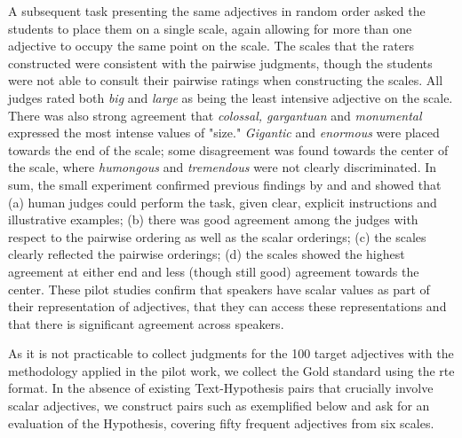 \documentclass[10pt]{article}
\begin{document}
A subsequent task presenting the same adjectives in random order asked the students to place them 
on a single scale, again allowing for more than one adjective to occupy the same point on the scale. 
The scales that the raters constructed were consistent with the pairwise judgments, though the students were not able 
to consult their pairwise ratings when constructing the scales. 
All judges rated both \textit{big} and \textit{large} as being the least intensive adjective on the scale. There was also 
strong agreement that \textit{colossal, gargantuan} and \textit{monumental} expressed the most intense values of "size."
\textit{Gigantic} and \textit{enormous} were placed towards the end of the scale; 
some disagreement was found towards the center of the scale, where \textit{humongous} and \textit{tremendous} 
were not clearly discriminated. In sum, the small experiment confirmed previous findings by \cite{sheinman2009adjscales} and \cite{mathieu2010verbs} 
and showed that (a) human judges could perform the task, 
given clear, explicit instructions and illustrative examples; (b) there was good agreement among the judges with respect 
to the pairwise ordering as well as the scalar orderings; (c) the scales clearly reflected the pairwise orderings; (d) the 
scales showed the highest agreement at either end and less (though still good) agreement towards the center.
These pilot studies confirm that speakers have scalar values as part of their representation of adjectives, that 
they can access these representations and that there is significant agreement across speakers. 

As it is not practicable to collect judgments for the 100 target adjectives with the methodology applied in the pilot work, 
we collect the Gold standard using the {\sc rte} format.
In the absence of existing Text-Hypothesis pairs that crucially involve scalar adjectives, we construct  
pairs such as exemplified below and ask for an evaluation of the Hypothesis, covering fifty frequent adjectives from six scales. 


\end{document}
